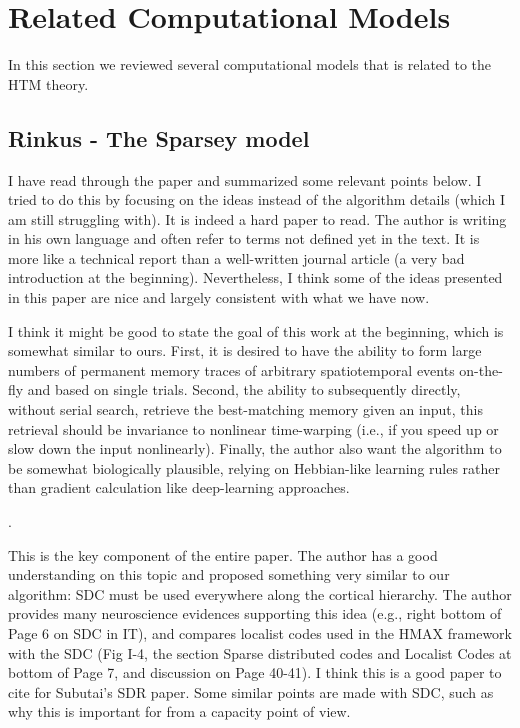 \documentclass{article} %
\begin{document}
\section{Related Computational Models}

In this section we reviewed several computational models that is related to the HTM theory.

\subsection{Rinkus - The Sparsey model}

I have read through the paper \cite{Rinkus2014} and summarized some relevant
points below. I tried to do this by focusing on the ideas instead of the
algorithm details (which I am still struggling with). It is indeed a hard paper
to read. The author is writing in his own language and often refer to terms not
defined yet in the text. It is more like a technical report than a well-written
journal article (a very bad introduction at the beginning). Nevertheless, I
think some of the ideas presented in this paper are nice and largely consistent
with what we have now.


I think it might be good to state the goal of this
work at the beginning, which is somewhat similar to ours. First, it is desired
to have the ability to form large numbers of permanent memory traces of
arbitrary spatiotemporal events on-the-fly and based on single trials. Second,
the ability to subsequently directly, without serial search, retrieve the
best-matching memory given an input, this retrieval should be invariance to
nonlinear time-warping (i.e., if you speed up or slow down the input
nonlinearly). Finally, the author also want the algorithm to be somewhat
biologically plausible, relying on Hebbian-like learning rules rather than
gradient calculation like deep-learning approaches.

.

This is the key component of the
entire paper.
The author has a good understanding on this topic and proposed something very
similar to our algorithm: SDC must be used everywhere along the cortical
hierarchy. The author provides many neuroscience evidences supporting this idea
(e.g., right bottom of Page 6 on SDC in IT), and compares localist codes used in
the HMAX framework with the SDC (Fig I-4, the section Sparse distributed codes
and Localist Codes at bottom of Page 7, and discussion on Page 40-41). I think
this is a good paper to cite for Subutai's SDR paper. Some similar points are
made with SDC, such as why this is important for from a capacity point of view.
\end{document}
